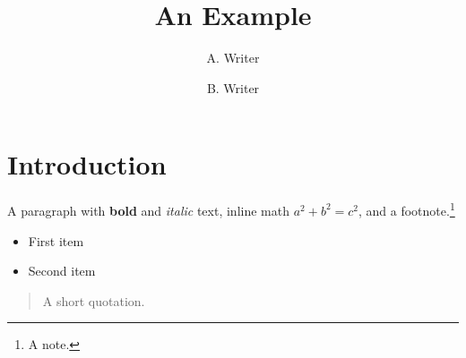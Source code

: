 \documentclass{article}
\title{An Example}
\author{A. Writer \and B. Writer}
\begin{document}
\maketitle
\section{Introduction}
A paragraph with \textbf{bold} and \emph{italic} text, inline math
\(a^2 + b^2 = c^2\), and a footnote.\footnote{A note.}

\begin{itemize}
  \item First item
  \item Second item
\end{itemize}

\begin{quote}
  A short quotation.
\end{quote}
\end{document}
